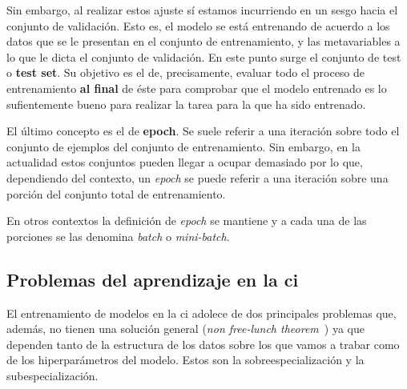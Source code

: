 Sin embargo, al realizar estos ajuste sí estamos incurriendo en un sesgo hacia el conjunto de validación. Esto es, el modelo se está entrenando de acuerdo a los datos que se le presentan en el conjunto de entrenamiento, y las metavariables a lo que le dicta el conjunto de validación. En este punto surge el conjunto de test o \textbf{test set}. Su objetivo es el de, precisamente, evaluar todo el proceso de entrenamiento \textbf{al final} de éste para comprobar que el modelo entrenado es lo sufientemente bueno para realizar la tarea para la que ha sido entrenado.

El último concepto es el de \textbf{epoch}. Se suele referir a una iteración sobre todo el conjunto de ejemplos del conjunto de entrenamiento. Sin embargo, en la actualidad estos conjuntos pueden llegar a ocupar demasiado por lo que, dependiendo del contexto, un \textit{epoch} se puede referir a una iteración sobre una porción del conjunto total de entrenamiento.

En otros contextos la definición de \textit{epoch} se mantiene y a cada una de las porciones se las denomina \textit{batch} o \textit{mini-batch}.

\subsection{Problemas del aprendizaje en la \acrlong{ci}}

El entrenamiento de modelos en la \gls{ci} adolece de dos principales problemas que, además, no tienen una solución general (\textit{non free-lunch theorem}~\cite{wolpert1997no}) ya que dependen tanto de la estructura de los datos sobre los que vamos a trabar como de los hiperparámetros del modelo. Estos son la sobreespecialización y la subespecialización.

